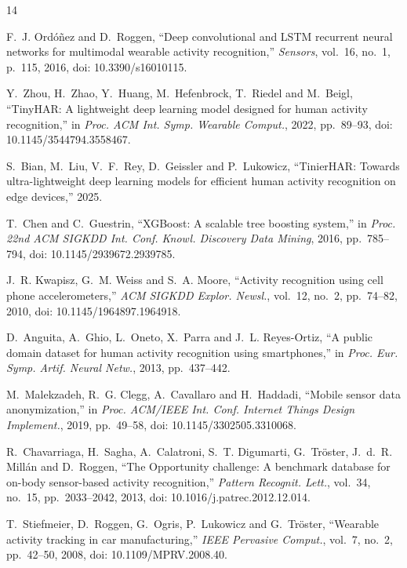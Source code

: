 \documentclass[conference,twocolumn]{IEEEtran}
\begin{document}
\balance

{\scriptsize
\begin{thebibliography}{14}

F.~J. Ord\'{o}\~{n}ez and D.~Roggen, ``Deep convolutional and LSTM recurrent neural networks for multimodal wearable activity recognition,'' \textit{Sensors}, vol.~16, no.~1, p.~115, 2016, doi: 10.3390/s16010115.

Y.~Zhou, H.~Zhao, Y.~Huang, M.~Hefenbrock, T.~Riedel and M.~Beigl, ``TinyHAR: A lightweight deep learning model designed for human activity recognition,'' in \textit{Proc. ACM Int. Symp. Wearable Comput.}, 2022, pp.~89--93, doi: 10.1145/3544794.3558467.

S.~Bian, M.~Liu, V.~F.~Rey, D.~Geissler and P.~Lukowicz, ``TinierHAR: Towards ultra-lightweight deep learning models for efficient human activity recognition on edge devices,'' 2025.

T.~Chen and C.~Guestrin, ``XGBoost: A scalable tree boosting system,'' in \textit{Proc. 22nd ACM SIGKDD Int. Conf. Knowl. Discovery Data Mining}, 2016, pp.~785--794, doi: 10.1145/2939672.2939785.

J.~R. Kwapisz, G.~M. Weiss and S.~A. Moore, ``Activity recognition using cell phone accelerometers,'' \textit{ACM SIGKDD Explor. Newsl.}, vol.~12, no.~2, pp.~74--82, 2010, doi: 10.1145/1964897.1964918.

D.~Anguita, A.~Ghio, L.~Oneto, X.~Parra and J.~L. Reyes-Ortiz, ``A public domain dataset for human activity recognition using smartphones,'' in \textit{Proc. Eur. Symp. Artif. Neural Netw.}, 2013, pp.~437--442.

M.~Malekzadeh, R.~G. Clegg, A.~Cavallaro and H.~Haddadi, ``Mobile sensor data anonymization,'' in \textit{Proc. ACM/IEEE Int. Conf. Internet Things Design Implement.}, 2019, pp.~49--58, doi: 10.1145/3302505.3310068.

R.~Chavarriaga, H.~Sagha, A.~Calatroni, S.~T. Digumarti, G.~Tr\"{o}ster, J.~d.~R. Mill\'{a}n and D.~Roggen, ``The Opportunity challenge: A benchmark database for on-body sensor-based activity recognition,'' \textit{Pattern Recognit. Lett.}, vol.~34, no.~15, pp.~2033--2042, 2013, doi: 10.1016/j.patrec.2012.12.014.

T.~Stiefmeier, D.~Roggen, G.~Ogris, P.~Lukowicz and G.~Tr\"{o}ster, ``Wearable activity tracking in car manufacturing,'' \textit{IEEE Pervasive Comput.}, vol.~7, no.~2, pp.~42--50, 2008, doi: 10.1109/MPRV.2008.40.


\end{thebibliography}}
\end{document}
